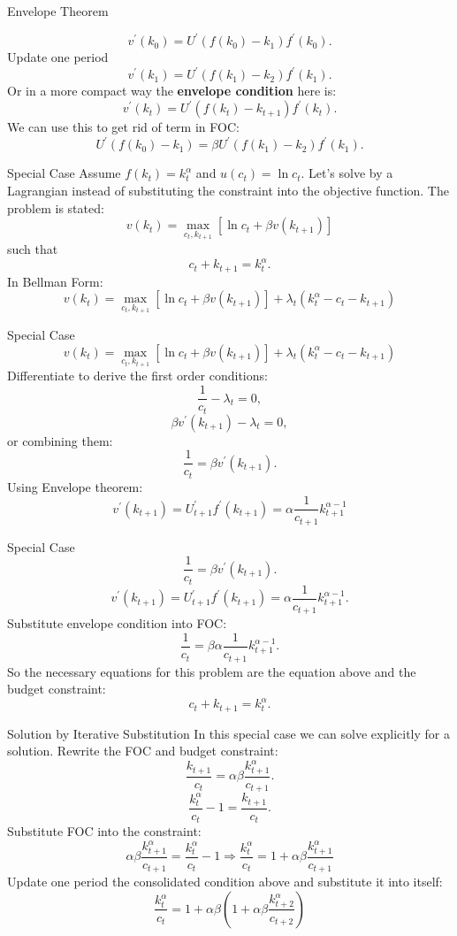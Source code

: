 \documentclass{beamer}
\begin{document}
\begin{frame}{Envelope Theorem}

\[v^\prime (k_0)=U^\prime(f(k_0)-k_1)f^\prime(k_0).
\]
Update one period 
\[v^\prime (k_1)=U^\prime(f(k_1)-k_2)f^\prime(k_1).
\]
Or in a more compact way the \textbf{envelope condition} here is:
\[v^\prime (k_{t})=U^\prime(f(k_{t})-k_{t+1})f^\prime(k_{t}).
\]
We can use this to get rid of term in FOC:
\[U^\prime(f(k_0)-k_1)=\beta U^\prime(f(k_1)-k_2)f^\prime(k_1).
\]

\end{frame}
\begin{frame}{Special Case}
    Assume $f(k_t)=k_t^\alpha$ and $u(c_t)=\ln c_t$. Let's solve by a Lagrangian instead of substituting the constraint into the objective function.
    The problem is stated:
    \[v(k_t)=\max_{c_t, k_{t+1}} \left[ \ln c_t+\beta v(k_{t+1})\right]
    \]
    such that 
    \[c_t+k_{t+1}=k_t^\alpha.
    \]
    In Bellman Form:
    \[v(k_t)=\max_{c_t, k_{t+1}} \left[ \ln c_t+\beta v(k_{t+1})\right]+\lambda_t(k_t^\alpha-c_t-k_{t+1})
    \]

\end{frame}
\begin{frame}{Special Case}
 \[v(k_t)=\max_{c_t, k_{t+1}} \left[ \ln c_t+\beta v(k_{t+1})\right]+\lambda_t(k_t^\alpha-c_t-k_{t+1})
    \]
    Differentiate to derive the first order conditions:
    \[\frac{1}{c_t}-\lambda_t=0,
    \]
    \[\beta v^\prime (k_{t+1})-\lambda_t=0,
    \]
    or combining them:
     \[\frac{1}{c_t}=\beta v^\prime (k_{t+1}).
    \]
    Using Envelope theorem:
    \[v^\prime (k_{t+1})=U_{t+1}^\prime f^\prime (k_{t+1})=\alpha \frac{1}{c_{t+1}}k_{t+1}^{\alpha-1} 
    \]
    \end{frame}
\begin{frame}{Special Case}
 \[\frac{1}{c_t}=\beta v^\prime (k_{t+1}).
    \]
     \[v^\prime (k_{t+1})=U_{t+1}^\prime f^\prime (k_{t+1})=\alpha \frac{1}{c_{t+1}}k_{t+1}^{\alpha-1} .
    \]
    Substitute envelope condition into FOC:
     \[\frac{1}{c_t}=\beta \alpha \frac{1}{c_{t+1}}k_{t+1}^{\alpha-1} .
    \]
    So the necessary equations for this problem are the equation above and the budget constraint:
    \[c_t+k_{t+1}=k_t^\alpha.
    \]
\end{frame}
\begin{frame}{Solution by Iterative Substitution}
    In this special case we can solve explicitly for a solution. Rewrite the FOC and budget constraint:
    \[\frac{k_{t+1}}{c_t}=\alpha \beta \frac{k_{t+1}^\alpha}{c_{t+1}}.
    \]
    \[\frac{k_{t}^\alpha}{c_t}-1=\frac{k_{t+1}}{c_t}.
    \]
    Substitute FOC into the constraint:
  \[\alpha \beta \frac{k_{t+1}^\alpha}{c_{t+1}}=
    \frac{k_{t}^\alpha}{c_t}-1\Rightarrow \frac{k_{t}^\alpha}{c_t}=1+\alpha \beta \frac{k_{t+1}^\alpha}{c_{t+1}}
    \]
    Update one period the consolidated condition above and substitute it into itself:
    \[\frac{k_{t}^\alpha}{c_t}=1+\alpha \beta (1+\alpha \beta \frac{k_{t+2}^\alpha}{c_{t+2}})
    \]
    \end{frame}
\end{document}
